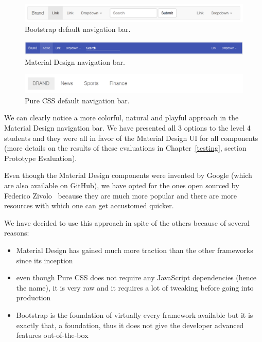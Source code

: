 \documentclass{l4proj}
\begin{document}
\begin{figure}[!ht]
    \centering
    \includegraphics[scale=0.35]{bootstrap-navbar}
    \caption{Bootstrap default navigation bar.}
    \label{fig:bootstrap-navbar}
\end{figure}

\begin{figure}[!ht]
    \centering
    \includegraphics[scale=0.35]{material-design-navbar}
    \caption{Material Design navigation bar.}
    \label{fig:material-design-navbar}
\end{figure}

\begin{figure}[!ht]
    \centering
    \includegraphics[scale=0.35]{purecss-navbar}
    \caption{Pure CSS default navigation bar.}
    \label{fig:purecss-navbar}
\end{figure}

We can clearly notice a more colorful, natural and playful approach in the Material Design navigation bar. We have
presented all 3 options to the level 4 students and they were all in favor of the Material Design UI for all components
(more details on the results of these evaluations in Chapter~\ref{testing}, section Prototype Evaluation).

Even though the Material Design components were invented by Google (which are also available on GitHub), we have opted for the ones open sourced by Federico
Zivolo~\cite{material-design} because they are much more popular and there are more resources with which one can get
accustomed quicker. 

We have decided to use this approach in spite of the others because of several reasons:

\begin{itemize}
    \item Material Design has gained much more traction than the other frameworks since its inception
    \item even though Pure CSS does not require any JavaScript dependencies (hence the name), it is very raw and it
	requires a lot of tweaking before going into production
    \item Bootstrap is the foundation of virtually every framework available but it is exactly that, a foundation, thus
	it does not give the developer advanced features out-of-the-box
\end{itemize}
\end{document}
